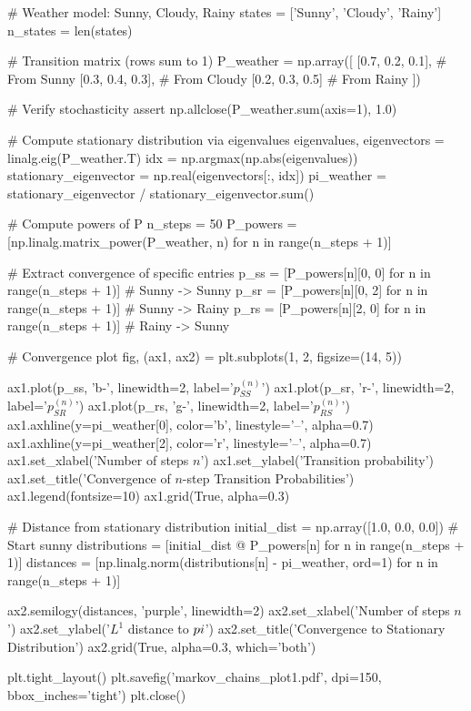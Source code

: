\documentclass[11pt,a4paper]{article}
\begin{document}
\begin{pycode}
# Weather model: Sunny, Cloudy, Rainy
states = ['Sunny', 'Cloudy', 'Rainy']
n_states = len(states)

# Transition matrix (rows sum to 1)
P_weather = np.array([
    [0.7, 0.2, 0.1],   # From Sunny
    [0.3, 0.4, 0.3],   # From Cloudy
    [0.2, 0.3, 0.5]    # From Rainy
])

# Verify stochasticity
assert np.allclose(P_weather.sum(axis=1), 1.0)

# Compute stationary distribution via eigenvalues
eigenvalues, eigenvectors = linalg.eig(P_weather.T)
idx = np.argmax(np.abs(eigenvalues))
stationary_eigenvector = np.real(eigenvectors[:, idx])
pi_weather = stationary_eigenvector / stationary_eigenvector.sum()

# Compute powers of P
n_steps = 50
P_powers = [np.linalg.matrix_power(P_weather, n) for n in range(n_steps + 1)]

# Extract convergence of specific entries
p_ss = [P_powers[n][0, 0] for n in range(n_steps + 1)]  # Sunny -> Sunny
p_sr = [P_powers[n][0, 2] for n in range(n_steps + 1)]  # Sunny -> Rainy
p_rs = [P_powers[n][2, 0] for n in range(n_steps + 1)]  # Rainy -> Sunny

# Convergence plot
fig, (ax1, ax2) = plt.subplots(1, 2, figsize=(14, 5))

ax1.plot(p_ss, 'b-', linewidth=2, label='$p_{SS}^{(n)}$')
ax1.plot(p_sr, 'r-', linewidth=2, label='$p_{SR}^{(n)}$')
ax1.plot(p_rs, 'g-', linewidth=2, label='$p_{RS}^{(n)}$')
ax1.axhline(y=pi_weather[0], color='b', linestyle='--', alpha=0.7)
ax1.axhline(y=pi_weather[2], color='r', linestyle='--', alpha=0.7)
ax1.set_xlabel('Number of steps $n$')
ax1.set_ylabel('Transition probability')
ax1.set_title('Convergence of $n$-step Transition Probabilities')
ax1.legend(fontsize=10)
ax1.grid(True, alpha=0.3)

# Distance from stationary distribution
initial_dist = np.array([1.0, 0.0, 0.0])  # Start sunny
distributions = [initial_dist @ P_powers[n] for n in range(n_steps + 1)]
distances = [np.linalg.norm(distributions[n] - pi_weather, ord=1)
             for n in range(n_steps + 1)]

ax2.semilogy(distances, 'purple', linewidth=2)
ax2.set_xlabel('Number of steps $n$')
ax2.set_ylabel('$L^1$ distance to $\\pi$')
ax2.set_title('Convergence to Stationary Distribution')
ax2.grid(True, alpha=0.3, which='both')

plt.tight_layout()
plt.savefig('markov_chains_plot1.pdf', dpi=150, bbox_inches='tight')
plt.close()
\end{pycode}
\end{document}
